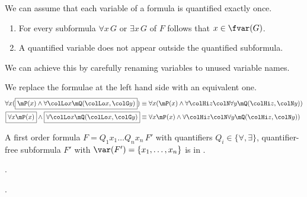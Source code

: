 
\noindent We can assume that each variable of a formula is quantified exactly once.
\begin{enumerate}
	\item For every subformula \( \forall x\, G \) or \( \exists x\, G \) of \( F \) follows that \( x\in\fvar(G) \).
	\item A quantified variable does not appear outside the quantified subformula.
\end{enumerate}
We can achieve this by carefully renaming variables to unused variable names.

\begin{example}We replace the formulae at the left hand side with an equivalent one.
	\begin{align*}
	\forall x (\boxed{\mP(x) \land \forall {\colLo x} \mQ({\colLo x}, {\colG y})})
	&\equiv
	\forall x (\mP(x) \land \forall {\colHi z}{\colN \forall y} \mQ({\colHi z}, {\colN y}))
	\\
	\boxed{\forall x \mP(x)} \land \boxed{\forall {\colLo x} \mQ({\colLo x}, {\colG y})}
	&\equiv
	\forall x \mP(x) \land \forall {\colHi z}{\colN \forall y} \mQ({\colHi z}, {\colN y})
	)\\
	\end{align*}
\end{example}

\begin{definition}\label{def:syntax:PNF}
	A first order formula \( F = Q_1 x_1 \ldots Q_n x_n\, F' \)
	with quantifiers \( Q_i\in\{\forall,\exists\} \),
	quantifier-free subformula \( F' \) with \( \var(F') = \{ x_1,\ldots,x_n \} \)
	is in .
\end{definition}

\begin{definition}\label{def:syntax:PNF}
	.
\end{definition}

\begin{definition}\label{def:syntax:PNF}
	.
\end{definition}

